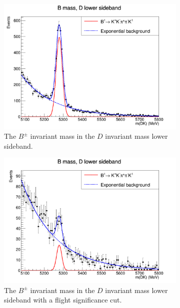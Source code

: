 \documentclass[12pt, a4paper, notitlepage, onecolumn]{article}
\numberwithin{equation}{section}
\begin{document}
\begin{figure}[H] 
  \centering
  \begin{subfigure}{0.5\textwidth}
    \centering
    \includegraphics[width=1\textwidth]{Plots/B2DKLower_Charmless.png}
    \caption{The $B^\pm$ invariant mass in the $D$ invariant mass lower sideband.}
    \label{fig_Bmass_charmless}
  \end{subfigure}%
  \begin{subfigure}{0.5\textwidth}
    \centering
    \includegraphics[width=1\textwidth]{Plots/B2DKLowerFDCut_Charmless.png}
    \caption{The $B^\pm$ invariant mass in the $D$ invariant mass lower sideband with a flight significance cut.}
    \label{fig_Bmass_charmless_fdcut}
  \end{subfigure}
  \caption{}
\end{figure}
\end{document}
